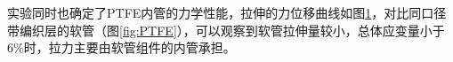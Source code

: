 \begin{figure}[!htb]
\centering
{}
\hspace{0.5cm}
\label{fig:PTFE-traction}
\end{figure}


实验同时也确定了PTFE内管的力学性能，拉伸的力位移曲线如图\ref{fig:PTFE-traction}，对比同口径带编织层的软管（图\ref{fig:PTFE}），可以观察到软管拉伸量较小，总体应变量小于$ 6\% $时，拉力主要由软管组件的内管承担。



